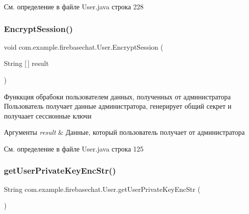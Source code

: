 См. определение в файле User.\+java строка 228

\mbox{\label{classcom_1_1example_1_1firebasechat_1_1_user_a9b6df56e1fc82db7c8d24e81d2250801}} 
\subsubsection{\texorpdfstring{Encrypt\+Session()}{EncryptSession()}}
{\footnotesize\ttfamily void com.\+example.\+firebasechat.\+User.\+Encrypt\+Session (\begin{DoxyParamCaption}\item[{String \mbox{[}$\,$\mbox{]}}]{result }\end{DoxyParamCaption})}



Функкция обрабоки пользователем данных, полученных от администратора Пользователь получает данные администратора, генерирует общий секрет и получаает сессионные ключи 


\begin{DoxyParams}{Аргументы}
{\em result} & Данные, который пользователь получает от администратора \\
\hline
\end{DoxyParams}


См. определение в файле User.\+java строка 125

\mbox{\label{classcom_1_1example_1_1firebasechat_1_1_user_a6dc80a46d2e49d8c03299dc5b7b15727}} 
\subsubsection{\texorpdfstring{get\+User\+Private\+Key\+Enc\+Str()}{getUserPrivateKeyEncStr()}}
{\footnotesize\ttfamily String com.\+example.\+firebasechat.\+User.\+get\+User\+Private\+Key\+Enc\+Str (\begin{DoxyParamCaption}{ }\end{DoxyParamCaption})}



